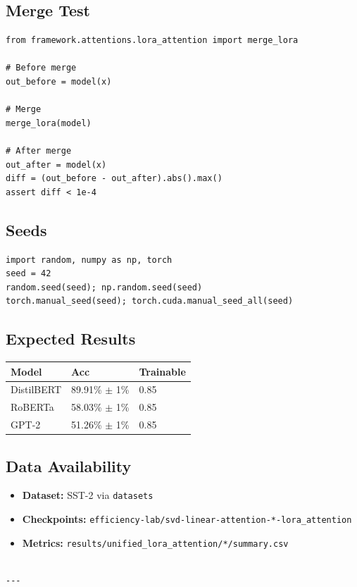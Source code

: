 \subsection{Merge Test}

\begin{lstlisting}
from framework.attentions.lora_attention import merge_lora

# Before merge
out_before = model(x)

# Merge
merge_lora(model)

# After merge
out_after = model(x)
diff = (out_before - out_after).abs().max()
assert diff < 1e-4
\end{lstlisting}

\subsection{Seeds}

\begin{lstlisting}
import random, numpy as np, torch
seed = 42
random.seed(seed); np.random.seed(seed)
torch.manual_seed(seed); torch.cuda.manual_seed_all(seed)
\end{lstlisting}

\subsection{Expected Results}

\begin{table}[H]
\centering
\small
\begin{tabular}{lll}
\toprule
\textbf{Model} & \textbf{Acc} & \textbf{Trainable} \\
\midrule
DistilBERT & 89.91\% $\pm$ 1\% & 0.85 \\
RoBERTa & 58.03\% $\pm$ 1\% & 0.85 \\
GPT-2 & 51.26\% $\pm$ 1\% & 0.85 \\
\bottomrule
\end{tabular}
\end{table}

\subsection{Data Availability}

\begin{itemize}
\item \textbf{Dataset:} SST-2 via \texttt{datasets}
\item \textbf{Checkpoints:} \texttt{efficiency-lab/svd-linear-attention-*-lora\_attention}
\item \textbf{Metrics:} \texttt{results/unified\_lora\_attention/*/summary.csv}
\end{itemize}
\begin{lstlisting}

---
\end{lstlisting}

